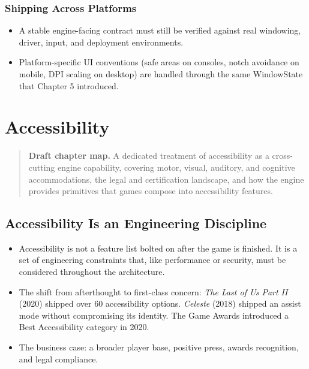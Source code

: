 \documentclass[
  11pt,
  letterpaper,
  DIV=11,
  numbers=noendperiod,
  twoside,
  open=right]{scrreprt}
\providecommand{\tightlist}{%
  \setlength{\itemsep}{0pt}\setlength{\parskip}{0pt}}
\begin{document}
\subsection{Shipping Across Platforms}\label{shipping-across-platforms}

\begin{itemize}
\tightlist
\item
  A stable engine-facing contract must still be verified against real
  windowing, driver, input, and deployment environments.
\item
  Platform-specific UI conventions (safe areas on consoles, notch
  avoidance on mobile, DPI scaling on desktop) are handled through the
  same WindowState that Chapter 5 introduced.
\end{itemize}

\chapter{Accessibility}\label{accessibility}

\begin{quote}
\textbf{Draft chapter map.} A dedicated treatment of accessibility as a
cross-cutting engine capability, covering motor, visual, auditory, and
cognitive accommodations, the legal and certification landscape, and how
the engine provides primitives that games compose into accessibility
features.
\end{quote}

\section{Accessibility Is an Engineering
Discipline}\label{accessibility-is-an-engineering-discipline}

\begin{itemize}
\tightlist
\item
  Accessibility is not a feature list bolted on after the game is
  finished. It is a set of engineering constraints that, like
  performance or security, must be considered throughout the
  architecture.
\item
  The shift from afterthought to first-class concern: \emph{The Last of
  Us Part II} (2020) shipped over 60 accessibility options.
  \emph{Celeste} (2018) shipped an assist mode without compromising its
  identity. The Game Awards introduced a Best Accessibility category in
  2020.
\item
  The business case: a broader player base, positive press, awards
  recognition, and legal compliance.
\end{itemize}
\end{document}
